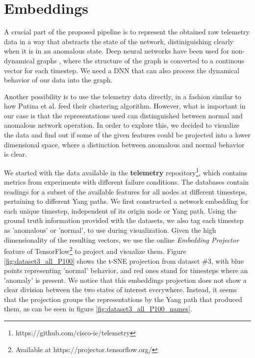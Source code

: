 \newpage
\section{Embeddings}
\label{sec:embeddings}

A crucial part of the proposed pipeline is to represent the obtained raw telemetry data in a way that abstracts the state of the network, distiniguishing clearly when it is in an anomalous state.
Deep neural networks have been used for non-dynamical graphs \cite{venkatakrishnan_graph2seq_2018}, where the structure of the graph is converted to a continous vector for each timestep.
We need a DNN that can also process the dynamical behavior of our data into the graph.

Another possibility is to use the telemetry data directly, in a fashion similar to how Putina et al.\cite{putina_telemetry-based_2018} feed their clustering algorithm.
However, what is important in our case is that the representations used can distinguished between normal and anomalous network operation.
In order to explore this, we decided to visualize the data and find out if some of the given features could be projected into a lower dimensional space, where a distinction between anomalous and normal behavior is clear.

We started with the data available in the \textbf{telemetry} repository\footnote{https://github.com/cisco-ie/telemetry}, which contains metrics from experiments with different failure conditions.
The databases contain readings for a subset of the available features for all nodes at different timesteps, pertaining to different Yang paths.
We first constructed a network embedding for each unique timestep, independent of its origin node or Yang path.
Using the ground truth information provided with the datasets, we also tag each timestep as 'anomalous' or 'normal', to use during visualization.
Given the high dimensionality of the resulting vectors, we use the online \textit{Embedding Projector} feature of TensorFlow\footnote{Available at https://projector.tensorflow.org/} to project and visualize them.
Figure \ref{fig:dataset3_all_P100} shows the t-SNE projection from dataset \#3, with blue points representing 'normal' behavior, and red ones stand for timesteps where an 'anomaly' is present.
We notice that this embeddings projection does not show a clear division between the two states of interest everywhere.
Instead, it seems that the projection groups the representations by the Yang path that produced them, as can be seen in figure \ref{fig:dataset3_all_P100_names}.

